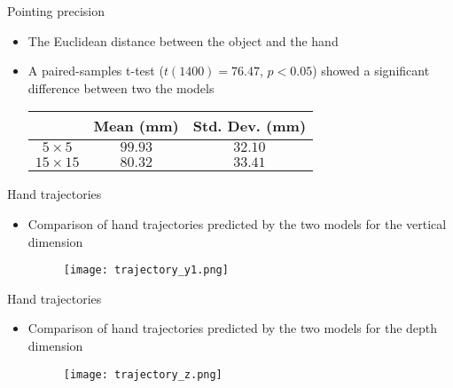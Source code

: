 \documentclass[xcolor=x11names,dvipsnames,compress]{beamer}
\renewcommand{\(}{\begin{columns}}
\renewcommand{\)}{\end{columns}}
\newcommand{\<}[1]{\begin{column}{#1}}
\renewcommand{\>}{\end{column}}
\begin{document}
\appendix

\begin{frame}{Pointing precision}
\begin{itemize}
      \item The Euclidean distance between the object and the hand 
      \item A paired-samples t-test ($t(1400)=76.47$, $p<0.05$) showed a  significant difference between two the models
      \begin{table}[h]\footnotesize
      \label{lab:table}
      \begin{tabular}{|c|c|c|}
	\hline     
	  & Mean (mm) & Std. Dev. (mm) \\ \hline
	$5\times 5$ & $99.93$ & $32.10$ \\ \hline
	$15\times 15$ & $80.32$  & $33.41$ \\ \hline
      \end{tabular}
      \end{table}      
      
\end{itemize}
\end{frame}

\begin{frame}{Hand trajectories}
\begin{itemize}
      \item Comparison of hand trajectories predicted by the two models for the vertical dimension 
      \begin{figure}
      \texttt{[image: trajectory\_y1.png]}      
      \end{figure}

\end{itemize}
\end{frame}



\begin{frame}{Hand trajectories}
\begin{itemize}
      \item Comparison of hand trajectories predicted by the two models for the depth dimension 
      \begin{figure}
      \texttt{[image: trajectory\_z.png]}      
      \end{figure}

\end{itemize}
\end{frame}
\end{document}
